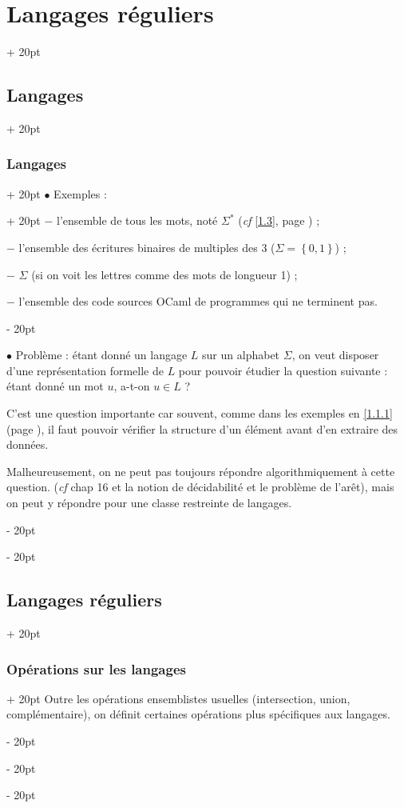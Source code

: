 \documentclass[a4paper, 12pt, twoside]{article}
\newcommand{\set}[1]{\left\{ #1 \right\}}
\newcommand{\ind}[1][20pt]{\advance\leftskip + #1}
\newcommand{\deind}[1][20pt]{\advance\leftskip - #1}
\newenvironment{indt}[2][20pt]{#2 \par \ind[#1]}{\par \deind} %
\begin{document}
\begin{indt}{\section{Langages réguliers}}
\begin{indt}{\subsection{Langages}}
\begin{indt}{\subsubsection{Langages}}
                \begin{indt}{$\bullet$ Exemples :}
                    $-$ l'ensemble de tous les mots, noté $\Sigma^*$ (\textit{cf} \ref{1.3}, page \pageref{1.3}) ;

                    $-$ l'ensemble des écritures binaires de multiples des 3 ($\Sigma = \set{0, 1}$) ;

                    $-$ $\Sigma$ (si on voit les lettres comme des mots de longueur 1) ;

                    $-$ l'ensemble des code sources OCaml de programmes qui ne terminent pas.
                \end{indt}

                \vspace{12pt}
                
                $\bullet$ Problème : étant donné un langage $L$ sur un alphabet $\Sigma$, on veut disposer d'une représentation formelle de $L$ pour pouvoir étudier la question suivante :
                étant donné un mot $u$, a-t-on $u \in L$ ?

                \vspace{6pt}
                
                C'est une question importante car souvent, comme dans les exemples en \ref{1.1.1} (page \pageref{1.1.1}), il faut pouvoir vérifier la structure d'un élément avant d'en extraire des données.

                Malheureusement, on ne peut pas toujours répondre algorithmiquement à cette question. (\textit{cf} chap 16 et la notion de décidabilité et le problème de l'arêt), mais on peut y répondre pour une classe restreinte de langages.
            \end{indt}
        \end{indt}

        \vspace{12pt}
        
        \begin{indt}{\subsection{Langages réguliers}}
            \label{1.3}

            \begin{indt}{\subsubsection{Opérations sur les langages}}
                Outre les opérations ensemblistes usuelles (intersection, union, complémentaire), on définit certaines opérations plus spécifiques aux langages.


\end{indt}
\end{indt}
\end{indt}
\end{document}
